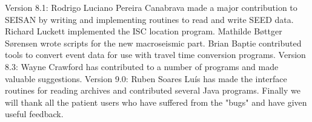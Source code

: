 Version 8.1: Rodrigo Luciano Pereira Canabrava made a major contribution to SEISAN by writing and implementing routines to read and write SEED data. Richard Luckett implemented the ISC location program. Mathilde B\o ttger S\o rensen wrote scripts for the new macroseismic part. Brian Baptie contributed tools to convert event data for use with travel time conversion programs. 
Version 8.3: Wayne Crawford has contributed to a number of programs and made valuable suggestions.
Version 9.0: Ruben Soares Lu\'is has made the interface routines for reading archives and contributed several Java programs.
Finally we will thank all the patient users who have suffered from the "bugs" and have given useful feedback. 


